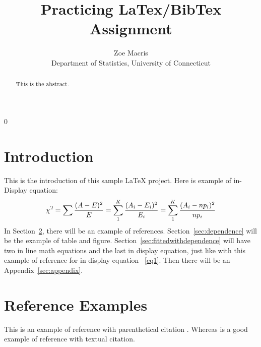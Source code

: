 \documentclass[12pt, letterpaper]{article}
\newcommand{\blind}{0}
\begin{document}

\blind
{
  \title{\bf Practicing LaTex/BibTex Assignment}
  \author{Zoe Macris\\[1ex]
  Department of Statistics, University of Connecticut\\
}
\date{}
  \maketitle} 


\doublespace

\begin{abstract}
This is the abstract. 
\lipsum[1]
\end{abstract}


\section{Introduction}
\label{sec:intro}

This is the introduction of this sample LaTeX project.
\lipsum[1-2]
Here is example of in-Display equation:
\begin{equation} 
\label{eq1}
\chi ^{2}=\sum\frac{(A-E)^2}{E}\\=\sum^{K}_{1}\frac{(A_{i}-E_{i})^2}{E_{i}}=\sum^{K}_{1}\frac{(A_{i}-np_{i})^2}{np_{i}}
\end{equation}
\lipsum[1-2]
In Section~\ref{sec:fitted}, there will be an example of references. Section~\ref{sec:dependence} will be the example of table and figure. Section~\ref{sec:fittedwithdependence} will have two in line math equations and the last in display equation, just like with this example of reference for in display equation ~\eqref{eq1}. Then there will be an Appendix~\ref{sec:appendix}. 


\section{Reference Examples}
\label{sec:fitted}

\lipsum[1-2]

This is an example of reference with parenthetical citation \citep{example1}.
Whereas \citet{example2} is a good example of reference with textual citation. 
\end{document}
